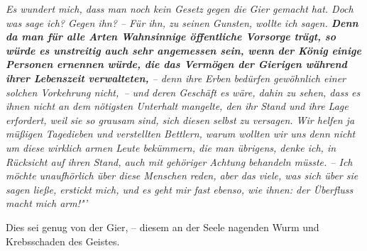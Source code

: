 \medskip

\textit{Es wundert mich, dass man noch kein Gesetz gegen die
Gier gemacht hat. Doch was
sage ich? Gegen ihn? – Für ihn, zu seinen Gunsten, wollte ich sagen.
\label{ref:13_22_wahnsinnige}\textbf{Denn da man
für alle Arten Wahnsinnige öffentliche Vorsorge trägt, so würde es unstreitig
auch sehr angemessen sein, wenn der König einige Personen ernennen würde, die das
Vermögen der Gierigen während ihrer Lebenszeit verwalteten,} -- denn ihre Erben
bedürfen gewöhnlich einer solchen Vorkehrung nicht,~-- und deren Geschäft es
wäre, dahin zu sehen, dass es ihnen nicht an dem nötigsten Unterhalt mangelte,
den ihr Stand und ihre Lage erfordert, weil sie so grausam sind, sich diesen
selbst zu versagen. Wir helfen ja müßigen Tagedieben und verstellten
Bettlern,
warum wollten wir uns denn nicht um diese wirklich armen Leute bekümmern, die
man übrigens, denke ich, in Rücksicht auf ihren Stand, auch mit gehöriger
Achtung behandeln müsste. -- Ich möchte unaufhörlich über diese Menschen reden,
aber das viele, was sich über sie sagen ließe, erstickt mich, und es geht mir
fast ebenso, wie ihnen: der Überfluss macht mich arm!"'}

\medskip

Dies sei genug von der Gier, -- diesem an der Seele nagenden Wurm und
Krebsschaden des Geistes.





